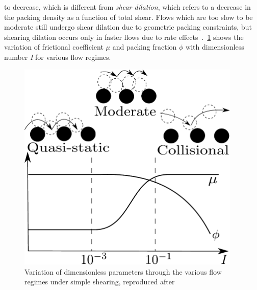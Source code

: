 to decrease, which is different from \textit{shear dilation}, which refers to a 
decrease in the packing density as a function of total shear. Flows which are 
too slow to be moderate still undergo shear dilation due to geometric packing 
constraints, but shearing dilation occurs only in faster flows due to rate 
effects~\citep{Kamrin2008}.~\cref{fig:Regime} shows the variation of 
frictional coefficient $\mu$ and packing fraction $\phi$ with dimensionless 
number \textit{I} for various flow regimes. 
\begin{figure}[htbp]
\centering
\includegraphics[width=0.95\textwidth]{Regime}
\caption[Variation of dimensionless parameters for various flow 
regimes]{Variation of dimensionless parameters through the various flow regimes 
under simple shearing, reproduced after~\citep{Kamrin2008}}
\label{fig:Regime}
\end{figure}

